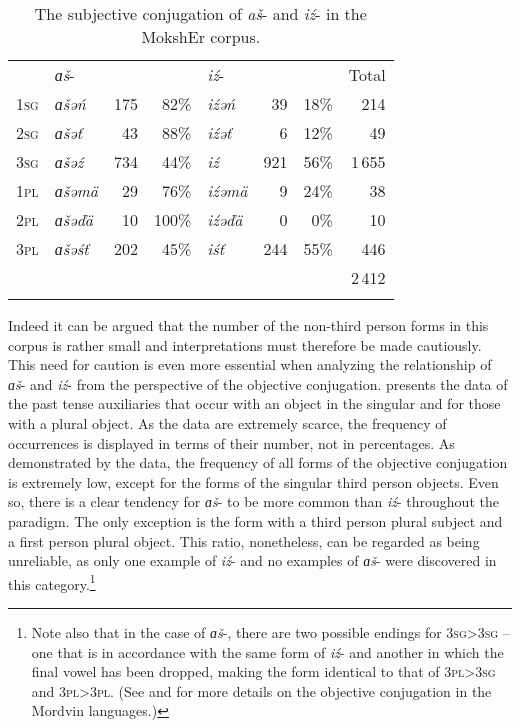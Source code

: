 \documentclass[output=paper,colorlinks,citecolor=brown,draft,draftmode]{langscibook}
\begin{document}
\largerpage[-1]
\begin{table}[t]
\small
\caption{The subjective conjugation of \textit{aš}- and \textit{iź}- in the MokshEr corpus.}
\label{tab:2:8}
\begin{tabular}{llrrlrr r}
\lsptoprule
							&{\textit{ɑš}-}		&			&			&{\textit{iź}-}	&			&			& {Total}\\ \cmidrule(lr){2-4}\cmidrule(lr){5-7}
\textsc{1sg}	&\textit{ɑšəń}			&175		& 82\% 	&\textit{iźəń}			&39		&18\% 	&214\\
\textsc{2sg}	&\textit{ɑšəť}				&43		&88\%		&\textit{iźəť}			&6			&12\%		&49\\
\textsc{3sg}	&\textit{ɑšəź}			&734		&44\%		&\textit{iź}				&921		&56\%		&1\,655\\
\textsc{1pl}		&\textit{ɑšəmä}			&29		&76\% 	&\textit{iźəmä}			&9			&24\%		&38\\
\textsc{2pl}		&\textit{ɑšəďä}			&10		&100\% 	&\textit{iźəďä}			&0 			&0\% 		&10\\
\textsc{3pl}		&\textit{ɑšəśť}			&202		&45\%		&\textit{iśť}				&244		&55\% 	&446\\ \midrule
							&								&			&			&							&			&			& 2\,412\\
\lspbottomrule
\end{tabular}
\end{table}

Indeed it can be argued that the number of the non-third person forms in this corpus is rather small and interpretations must therefore be made cautiously. This need for caution is even more essential when analyzing the relationship of \textit{ɑš}- and \textit{iź}- from the perspective of the objective conjugation.  presents the data of the past tense auxiliaries that occur with an object in the singular and  for those with a plural object. As the data are extremely scarce, the frequency of occurrences is displayed in terms of their number, not in percentages. As demonstrated by the data, the frequency of all forms of the objective conjugation is extremely low, except for the forms of the singular third person objects. Even so, there is a clear tendency for \textit{ɑš}- to be more common than \textit{iź}- throughout the paradigm. The only exception is the form with a third person plural subject and a first person plural object. This ratio, nonetheless, can be regarded as being unreliable, as only one example of \textit{iź}- and no examples of \textit{ɑš}- were discovered in this category.\footnote{Note also that in the case of \textit{ɑš}-, there are two possible endings for \textsc{3sg>3sg} -- one that is in accordance with the same form of \textit{iź}- and another in which the final vowel has been dropped, making the form identical to that of \textsc{3pl>3sg} and \textsc{3pl>3pl}. (See \citealt{Trosterud1994} and \citealt{Keresztes1999} for more details on the objective conjugation in the Mordvin languages.)}
\end{document}
